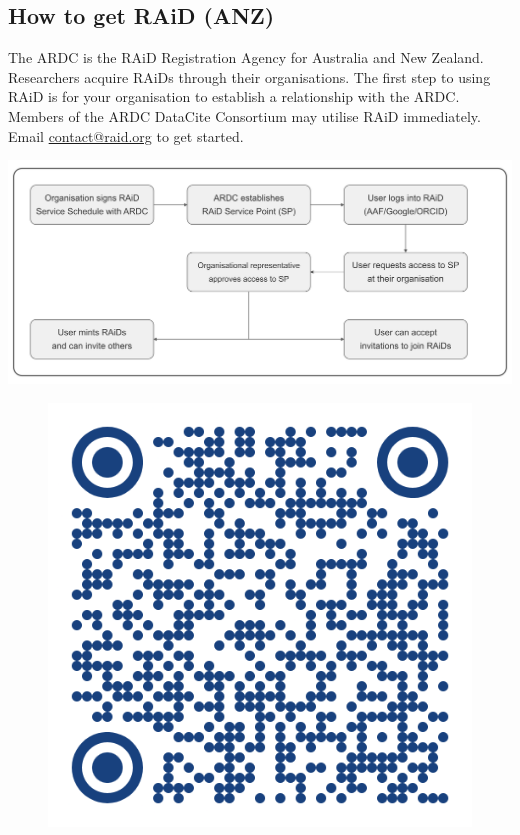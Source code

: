 \documentclass[a0,portrait]{a0poster}
\newenvironment{Figure}
  {\par\medskip\noindent\minipage{\linewidth}}
  {\endminipage\par\medskip}
\begin{document}
\begin{multicols}{3}

\vspace{-1cm}

\color{ARDCBlue}
\section*{\LARGE How to get RAiD (ANZ)}
\color{DarkGrey}
\large{
The ARDC is the RAiD Registration Agency for Australia and New Zealand. Researchers acquire RAiDs through their organisations. The first step to using RAiD is for your organisation to establish a relationship with the ARDC. Members of the ARDC DataCite Consortium may utilise RAiD immediately. Email \href{mailto:contact@raid.org}{contact@raid.org} to get started. 
}

\begin{Figure}
 \centering
 \includegraphics[width=0.9\linewidth]{figures/raid-workflow-anz.png}
 \label{raid-workflow}
\end{Figure}


\vspace{1cm}

\begin{figure}
    \vspace{-1.25cm}  %
    \includegraphics[width=0.08\columnwidth]{figures/QR-code.png}
    \vspace{0.5cm}  %
\end{figure}
\hspace{1cm}  %



\end{multicols}
\end{document}
